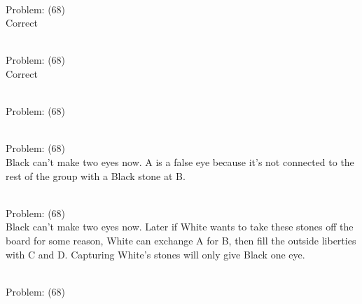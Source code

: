 \documentclass[11pt]{article}
\begin{document}
\begin{minipage}[t]{0.5\textwidth}
  {\centering
  
\\
Problem: (68)\\
Correct\\
  }
\end{minipage}
\begin{minipage}[t]{0.5\textwidth}
  {\centering
  
\\
Problem: (68)\\
Correct\\
  }
\end{minipage}
\begin{minipage}[t]{0.5\textwidth}
  {\centering
  
\\
Problem: (68)\\
  }
\end{minipage}
\begin{minipage}[t]{0.5\textwidth}
  {\centering
  
\\
Problem: (68)\\
Black can't make two eyes now. A is a false eye because it's not connected to the rest of the group with a Black stone at B.\\
  }
\end{minipage}
\begin{minipage}[t]{0.5\textwidth}
  {\centering
  
\\
Problem: (68)\\
Black can't make two eyes now. Later if White wants to take these stones off the board for some reason, White can exchange A for B, then fill the outside liberties with C and D. Capturing White's stones will only give Black one eye.\\
  }
\end{minipage}
\begin{minipage}[t]{0.5\textwidth}
  {\centering
  
\\
Problem: (68)\\
  }
\end{minipage}
\end{document}
